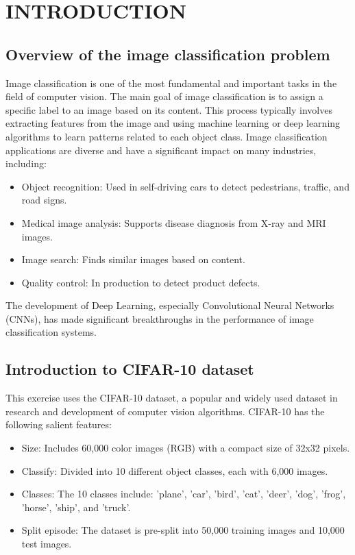 \documentclass[12pt]{article}
\begin{document}
\newpage
\tableofcontents

\newpage
\section{INTRODUCTION}
\subsection{Overview of the image classification problem}
Image classification is one of the most fundamental and important tasks in the field of computer vision. The main goal of image classification is to assign a specific label to an image based on its content. This process typically involves extracting features from the image and using machine learning or deep learning algorithms to learn patterns related to each object class. Image classification applications are diverse and have a significant impact on many industries, including:
\begin{itemize}
    \item Object recognition: Used in self-driving cars to detect pedestrians, traffic, and road signs.
    \item Medical image analysis: Supports disease diagnosis from X-ray and MRI images.
    \item Image search: Finds similar images based on content.
    \item Quality control: In production to detect product defects.
\end{itemize}
The development of Deep Learning, especially Convolutional Neural Networks (CNNs), has made significant breakthroughs in the performance of image classification systems.

\subsection{Introduction to CIFAR-10 dataset}
This exercise uses the CIFAR-10 dataset, a popular and widely used dataset in research and development of computer vision algorithms. CIFAR-10 has the following salient features:
\begin{itemize}
    \item Size: Includes 60,000 color images (RGB) with a compact size of 32x32 pixels.
    \item Classify: Divided into 10 different object classes, each with 6,000 images.
    \item Classes: The 10 classes include: 'plane', 'car', 'bird', 'cat', 'deer', 'dog', 'frog', 'horse', 'ship', and 'truck'.
    \item Split episode: The dataset is pre-split into 50,000 training images and 10,000 test images.
\end{itemize}
\end{document}
